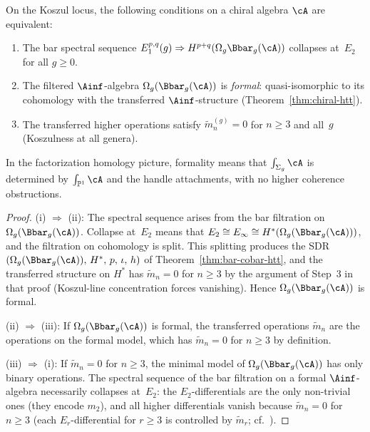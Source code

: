 \begin{proposition}
\label{prop:e2-collapse-formality}
On the Koszul locus, the following conditions on a chiral algebra
$\cA$ are equivalent:
\begin{enumerate}[label=(\roman*)]
\item The bar spectral sequence
$E_1^{p,q}(g) \Rightarrow H^{p+q}(\Omega_g\Bbar_g(\cA))$
collapses at~$E_2$ for all $g \geq 0$.
\item The filtered $\Ainf$-algebra $\Omega_g(\Bbar_g(\cA))$ is
\emph{formal}: quasi-isomorphic to its cohomology with the
transferred $\Ainf$-structure
(Theorem~\textup{\ref{thm:chiral-htt}}).
\item The transferred higher operations satisfy
$\tilde{m}_n^{(g)} = 0$ for $n \geq 3$ and all~$g$
(Koszulness at all genera).
\end{enumerate}
In the factorization homology picture, formality means that
$\int_{\Sigma_g}\cA$ is determined by $\int_{\mathbb{P}^1}\cA$
and the handle attachments, with no higher coherence obstructions.
\end{proposition}

\begin{proof}
(i) $\Rightarrow$ (ii): The spectral sequence arises from the bar
filtration on $\Omega_g(\Bbar_g(\cA))$. Collapse at~$E_2$ means
that $E_2 \cong E_\infty \cong H^*(\Omega_g(\Bbar_g(\cA)))$,
and the filtration on cohomology is split. This splitting produces
the SDR $(\Omega_g(\Bbar_g(\cA)),\, H^*,\, p,\, \iota,\, h)$
of Theorem~\ref{thm:bar-cobar-htt}, and the transferred structure
on $H^*$ has $\tilde{m}_n = 0$ for $n \geq 3$ by the argument of
Step~3 in that proof (Koszul-line concentration forces vanishing).
Hence $\Omega_g(\Bbar_g(\cA))$ is formal.

(ii) $\Rightarrow$ (iii): If $\Omega_g(\Bbar_g(\cA))$ is formal,
the transferred operations $\tilde{m}_n$ are the operations on the
formal model, which has $\tilde{m}_n = 0$ for $n \geq 3$ by
definition.

(iii) $\Rightarrow$ (i): If $\tilde{m}_n = 0$ for $n \geq 3$,
the minimal model of $\Omega_g(\Bbar_g(\cA))$ has only binary
operations. The spectral sequence of the bar filtration on a
formal $\Ainf$-algebra necessarily collapses at~$E_2$:
the $E_2$-differentials are the only non-trivial ones
(they encode $m_2$), and all higher differentials vanish because
$\tilde{m}_n = 0$ for $n \geq 3$
(each $E_r$-differential for $r \geq 3$ is controlled by
$\tilde{m}_r$; cf.\ \cite[Theorem~3.4.1]{LV12}).
\end{proof}

